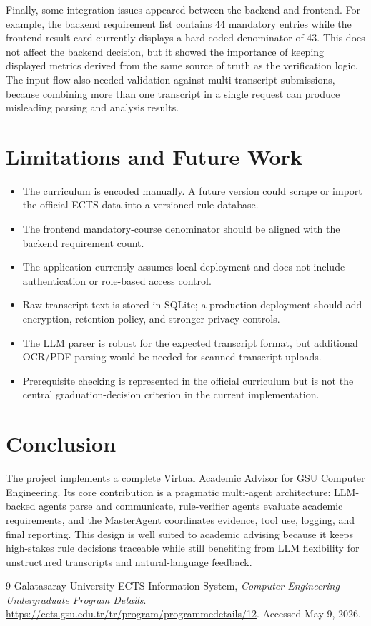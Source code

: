 \documentclass[11pt,a4paper]{article}
\begin{document}
Finally, some integration issues appeared between the backend and frontend. For
example, the backend requirement list contains 44 mandatory entries while the
frontend result card currently displays a hard-coded denominator of 43. This
does not affect the backend decision, but it showed the importance of keeping
displayed metrics derived from the same source of truth as the verification
logic. The input flow also needed validation against multi-transcript
submissions, because combining more than one transcript in a single request can
produce misleading parsing and analysis results.

\section{Limitations and Future Work}

\begin{itemize}
  \item The curriculum is encoded manually. A future version could scrape or
  import the official ECTS data into a versioned rule database.
  \item The frontend mandatory-course denominator should be aligned with the
  backend requirement count.
  \item The application currently assumes local deployment and does not include
  authentication or role-based access control.
  \item Raw transcript text is stored in SQLite; a production deployment should
  add encryption, retention policy, and stronger privacy controls.
  \item The LLM parser is robust for the expected transcript format, but
  additional OCR/PDF parsing would be needed for scanned transcript uploads.
  \item Prerequisite checking is represented in the official curriculum but is
  not the central graduation-decision criterion in the current implementation.
\end{itemize}

\section{Conclusion}

The project implements a complete Virtual Academic Advisor for GSU Computer
Engineering. Its core contribution is a pragmatic multi-agent architecture:
LLM-backed agents parse and communicate, rule-verifier agents evaluate academic
requirements, and the MasterAgent coordinates evidence, tool use, logging, and
final reporting. This design is well suited to academic advising because it
keeps high-stakes rule decisions traceable while still benefiting from LLM
flexibility for unstructured transcripts and natural-language feedback.

\begin{thebibliography}{9}
Galatasaray University ECTS Information System,
\textit{Computer Engineering Undergraduate Program Details}.
\url{https://ects.gsu.edu.tr/tr/program/programmedetails/12}.
Accessed May 9, 2026.

\end{thebibliography}
\end{document}
